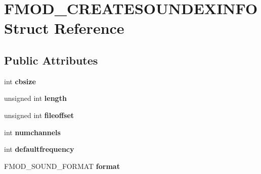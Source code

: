 \hypertarget{struct_f_m_o_d___c_r_e_a_t_e_s_o_u_n_d_e_x_i_n_f_o}{}\section{F\+M\+O\+D\+\_\+\+C\+R\+E\+A\+T\+E\+S\+O\+U\+N\+D\+E\+X\+I\+N\+FO Struct Reference}
\label{struct_f_m_o_d___c_r_e_a_t_e_s_o_u_n_d_e_x_i_n_f_o}
\subsection*{Public Attributes}
\begin{DoxyCompactItemize}
\item 
int {\bfseries cbsize}\hypertarget{struct_f_m_o_d___c_r_e_a_t_e_s_o_u_n_d_e_x_i_n_f_o_a905941acdbc5922a694fbb44761a1fa6}{}\label{struct_f_m_o_d___c_r_e_a_t_e_s_o_u_n_d_e_x_i_n_f_o_a905941acdbc5922a694fbb44761a1fa6}

\item 
unsigned int {\bfseries length}\hypertarget{struct_f_m_o_d___c_r_e_a_t_e_s_o_u_n_d_e_x_i_n_f_o_a4747dfdcc1a5b3aa8429b265655a0745}{}\label{struct_f_m_o_d___c_r_e_a_t_e_s_o_u_n_d_e_x_i_n_f_o_a4747dfdcc1a5b3aa8429b265655a0745}

\item 
unsigned int {\bfseries fileoffset}\hypertarget{struct_f_m_o_d___c_r_e_a_t_e_s_o_u_n_d_e_x_i_n_f_o_a7b44d4b86cadbcd0b82f7103312d64ae}{}\label{struct_f_m_o_d___c_r_e_a_t_e_s_o_u_n_d_e_x_i_n_f_o_a7b44d4b86cadbcd0b82f7103312d64ae}

\item 
int {\bfseries numchannels}\hypertarget{struct_f_m_o_d___c_r_e_a_t_e_s_o_u_n_d_e_x_i_n_f_o_a07286cab031745284732e094ca8f722e}{}\label{struct_f_m_o_d___c_r_e_a_t_e_s_o_u_n_d_e_x_i_n_f_o_a07286cab031745284732e094ca8f722e}

\item 
int {\bfseries defaultfrequency}\hypertarget{struct_f_m_o_d___c_r_e_a_t_e_s_o_u_n_d_e_x_i_n_f_o_abc2bb4d103afbbffb3cfdda4dc54b10b}{}\label{struct_f_m_o_d___c_r_e_a_t_e_s_o_u_n_d_e_x_i_n_f_o_abc2bb4d103afbbffb3cfdda4dc54b10b}

\item 
F\+M\+O\+D\+\_\+\+S\+O\+U\+N\+D\+\_\+\+F\+O\+R\+M\+AT {\bfseries format}\hypertarget{struct_f_m_o_d___c_r_e_a_t_e_s_o_u_n_d_e_x_i_n_f_o_a1cfd3a1633370ea3016f722f8c2531ce}{}\label{struct_f_m_o_d___c_r_e_a_t_e_s_o_u_n_d_e_x_i_n_f_o_a1cfd3a1633370ea3016f722f8c2531ce}


\end{DoxyCompactItemize}
